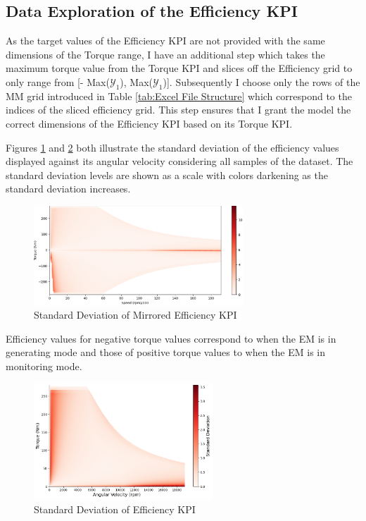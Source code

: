 \documentclass{report} %
\begin{document}
\subsection{Data Exploration of the Efficiency KPI}\label{subsec:Deep Dive into 3D KPI}
As the target values of the Efficiency \ac{KPI} are not provided with the same dimensions of the Torque range, I have an additional step which takes the maximum 
torque value from the Torque \ac{KPI} and slices off the Efficiency grid to only range from [- Max($\mathcal{Y}_1$), Max($\mathcal{Y}_1$)]. 
Subsequently I choose only the rows of the MM grid introduced in Table \ref{tab:Excel File Structure} which correspond to the indices of the sliced efficiency grid.
This step ensures that I grant the model the correct dimensions of the Efficiency \ac{KPI} based on its Torque \ac{KPI}.

Figures \ref{fig:Standard Deviation of Efficiency KPI(Mirrored Map)} and \ref{fig:Standard Deviation of Efficiency KPI} both illustrate the standard deviation 
of the efficiency values displayed against its angular velocity considering all samples of the dataset. The standard deviation levels are shown as a scale with colors 
darkening as the standard deviation increases.

\begin{figure}[H]
    \centering
    \includegraphics[width=0.7\textwidth]{./ReportImages/stddev_y2.png} 
    \caption{Standard Deviation of Mirrored Efficiency \ac{KPI}} 
    \label{fig:Standard Deviation of Efficiency KPI(Mirrored Map)}
\end{figure}

Efficiency values for negative torque values correspond to when the \ac{EM} is in generating mode and those of positive torque values to when the \ac{EM} is in 
monitoring mode.

\begin{figure}[H]
    \centering
    \includegraphics[width=0.6\textwidth]{./ReportImages/pos_stddev_y2.png} 
    \caption{Standard Deviation of Efficiency \ac{KPI}} 
    \label{fig:Standard Deviation of Efficiency KPI}
\end{figure}
\end{document}
